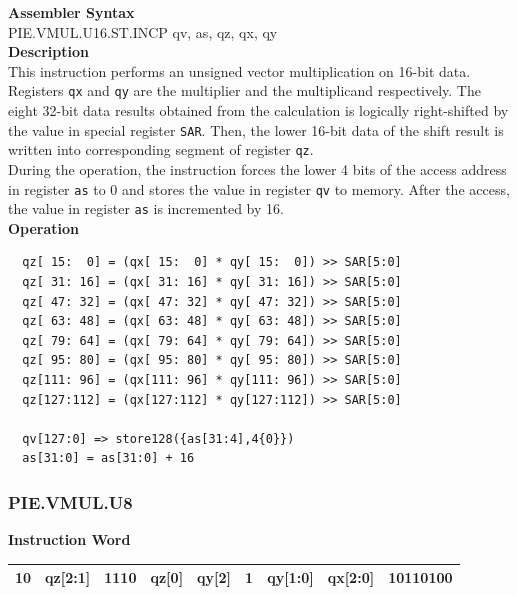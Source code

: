 \textbf{Assembler Syntax} \\
PIE.VMUL.U16.ST.INCP qv, as, qz, qx, qy \\
\textbf{Description} \\
This instruction performs an unsigned vector multiplication on 16-bit data. Registers \lstinline{qx} and \lstinline{qy} are the multiplier and the multiplicand respectively. The eight 32-bit data results obtained from the calculation is logically right-shifted by the value in special register \lstinline{SAR}. Then, the lower 16-bit data of the shift result is written into corresponding segment of register \lstinline{qz}. \\ During the operation, the instruction forces the lower 4 bits of the access address in register \lstinline{as} to 0 and stores the value in register \lstinline{qv} to memory. After the access, the value in register \lstinline{as} is incremented by 16.\\
\textbf{Operation}
\begin{lstlisting}
  qz[ 15:  0] = (qx[ 15:  0] * qy[ 15:  0]) >> SAR[5:0]
  qz[ 31: 16] = (qx[ 31: 16] * qy[ 31: 16]) >> SAR[5:0]
  qz[ 47: 32] = (qx[ 47: 32] * qy[ 47: 32]) >> SAR[5:0]
  qz[ 63: 48] = (qx[ 63: 48] * qy[ 63: 48]) >> SAR[5:0]
  qz[ 79: 64] = (qx[ 79: 64] * qy[ 79: 64]) >> SAR[5:0]
  qz[ 95: 80] = (qx[ 95: 80] * qy[ 95: 80]) >> SAR[5:0]
  qz[111: 96] = (qx[111: 96] * qy[111: 96]) >> SAR[5:0]
  qz[127:112] = (qx[127:112] * qy[127:112]) >> SAR[5:0]

  qv[127:0] => store128({as[31:4],4{0}})
  as[31:0] = as[31:0] + 16
\end{lstlisting}

\newpage
\subsubsection{PIE.VMUL.U8}\label{instruction:PIEVMULU8}
\setlength\tabcolsep{6pt}
\textbf{Instruction Word} \\
\begin{tabular}{|c|c|c|c|c|c|c|c|c|}
	\hline
	10 & qz[2:1] & 1110 & qz[0] & qy[2] & 1 & qy[1:0] & qx[2:0] & 10110100 \\
	\hline
\end{tabular}

